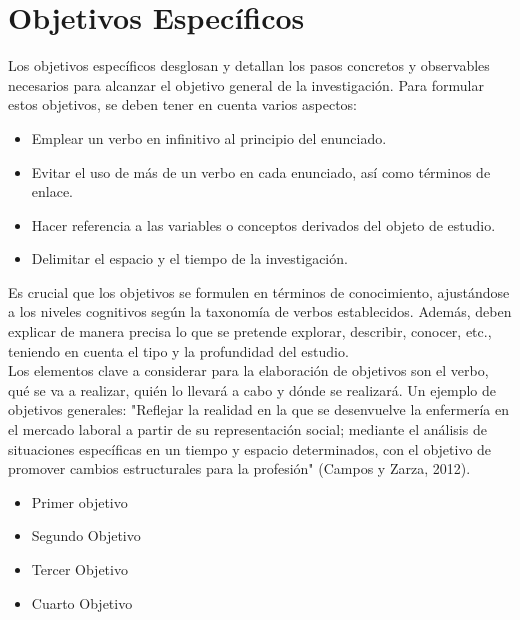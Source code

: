 \documentclass[12pt,a4paper,oneside]{report}
\begin{document}
\section{Objetivos Específicos}

Los objetivos específicos desglosan y detallan los pasos concretos y observables necesarios para alcanzar el objetivo general de la investigación. Para formular estos objetivos, se deben tener en cuenta varios aspectos: \\

\begin{itemize}
    \item Emplear un verbo en infinitivo al principio del enunciado. 
    \item Evitar el uso de más de un verbo en cada enunciado, así como términos de enlace.
    \item Hacer referencia a las variables o conceptos derivados del objeto de estudio.
    \item Delimitar el espacio y el tiempo de la investigación.
\end{itemize}

Es crucial que los objetivos se formulen en términos de conocimiento, ajustándose a los niveles cognitivos según la taxonomía de verbos establecidos. Además, deben explicar de manera precisa lo que se pretende explorar, describir, conocer, etc., teniendo en cuenta el tipo y la profundidad del estudio.\\

Los elementos clave a considerar para la elaboración de objetivos son el verbo, qué se va a realizar, quién lo llevará a cabo y dónde se realizará. Un ejemplo de objetivos generales: "Reflejar la realidad en la que se desenvuelve la enfermería en el mercado laboral a partir de su representación social; mediante el análisis de situaciones específicas en un tiempo y espacio determinados, con el objetivo de promover cambios estructurales para la profesión" (Campos y Zarza, 2012).

\begin{itemize}
\item Primer objetivo
\item Segundo Objetivo
\item Tercer Objetivo
\item Cuarto Objetivo
\end{itemize}



\end{document}
